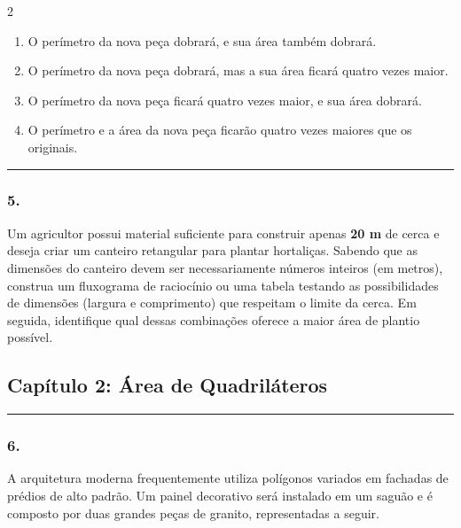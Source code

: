 \documentclass[twoside, 10pt, a4paper]{article}
\newlength{\espacoPosTitulo}\setlength{\espacoPosTitulo}{0.3cm}
\newlength{\espacoPreQuestao}\setlength{\espacoPreQuestao}{0.1cm}
\newlength{\espacoQuestao}\setlength{\espacoQuestao}{0.2cm}
\newlength{\espacoAlt}\setlength{\espacoAlt}{0.2cm}
\begin{document}
\begin{multicols*}{2}
\begin{enumerate}[label=\alph*), itemsep=\espacoAlt]
\item O perímetro da nova peça dobrará, e sua área também dobrará.
\item O perímetro da nova peça dobrará, mas a sua área ficará quatro vezes maior.
\item O perímetro da nova peça ficará quatro vezes maior, e sua área dobrará.
\item O perímetro e a área da nova peça ficarão quatro vezes maiores que os originais.
\end{enumerate}
\par\vspace{\espacoQuestao}

\noindent\textcolor{CorLinha}{\rule{\linewidth}{0.5pt}} 
\par\vspace{\espacoPreQuestao}
\subsubsection*{5.} Um agricultor possui material suficiente para construir apenas \textbf{20 m} de cerca e deseja criar um canteiro retangular para plantar hortaliças. Sabendo que as dimensões do canteiro devem ser necessariamente números inteiros (em metros), construa um fluxograma de raciocínio ou uma tabela testando as possibilidades de dimensões (largura e comprimento) que respeitam o limite da cerca. Em seguida, identifique qual dessas combinações oferece a maior área de plantio possível.
\par\vspace{\espacoQuestao}

\subsection*{Capítulo 2: Área de Quadriláteros}
\vspace{-0.2cm}\noindent\rule{\linewidth}{1.5pt} 
\par\vspace{\espacoPosTitulo}
\subsubsection*{6.} A arquitetura moderna frequentemente utiliza polígonos variados em fachadas de prédios de alto padrão. Um painel decorativo será instalado em um saguão e é composto por duas grandes peças de granito, representadas a seguir.


\end{multicols*}
\end{document}
